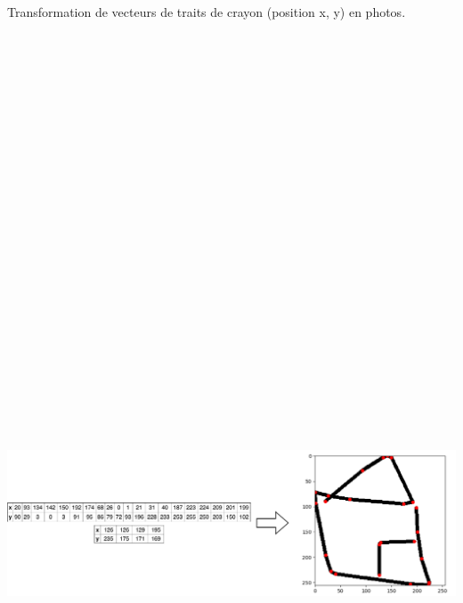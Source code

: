 



\vspace{-2mm}




\begin{center}
Transformation de vecteurs de traits de crayon (position x, y)  en photos.
\end{center}

\begin{center}

\includegraphics[width=44cm,height=44cm,keepaspectratio]{figures/Transformations_horizontal.pdf}


\end{center}
